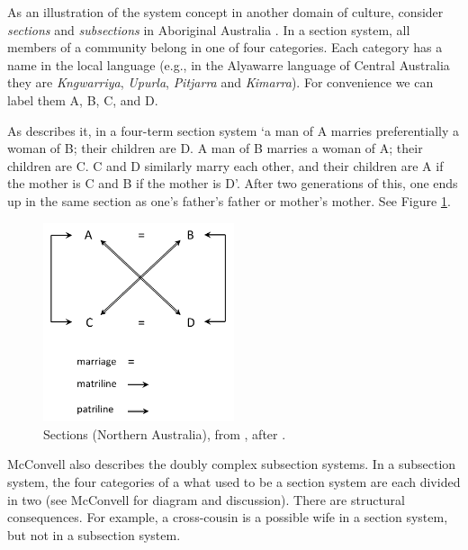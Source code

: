 As an illustration of the system concept in another domain of culture, consider \textit{sections} 
and \textit{subsections} in Aboriginal Australia \citep{radcliffe-brown_social_1931}. In a 
section system, all members of a community belong in one of four 
categories. Each category has a name in the local language (e.g., in the 
Alyawarre language of Central Australia they are \textit{Kngwarriya}, 
\textit{Upurla}, \textit{Pitjarra} and \textit{Kimarra}). For convenience we can label them A, B, C, and D. 



As \citet[2]{mcconvell_origin_1985} describes it, in a four-term section system \textquoteleft a man 
of A marries preferentially a woman of B; their children are D. A man of 
B marries a woman of A; their children are C. C and D similarly marry 
each other, and their children are A if the mother is C and B if the 
mother is D'. After two generations of this, one ends up in the same 
section as one's father's father or mother's mother. See Figure \ref{sections}.

\begin{figure}[h]
\includegraphics[width=0.5\textwidth,keepaspectratio]{figures/Fig05}
\caption{Sections (Northern Australia), from \citet[32]{mcconvell_origin_1985}, after 
\citet{radcliffe-brown_social_1931}. }
\label{sections}
\end{figure}







McConvell also describes the doubly complex subsection systems. In a subsection system, the four categories of a what used to be a section system are each divided in 
two (see McConvell for diagram and discussion). There are structural 
consequences. For example, a cross-cousin is a possible wife in a 
section system, but not in a subsection system. 



